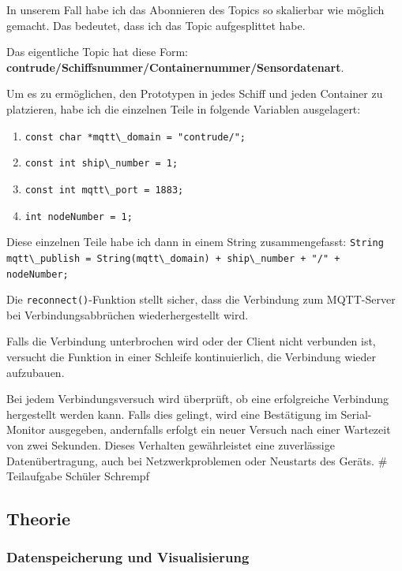 \documentclass[
    headings=optiontotocandhead,%
    twoside,
    numbers=noenddot,%
    12pt, %
    titlepage, %
    parskip=full, %
    listof=leveldown, 
    numbers=noenddot, %
    a4paper,DIV=14,
    BCOR=15mm,
]{scrbook}
\newcommand{\passthrough}[1]{#1}
\newcommand*{\authormark}{}
\newcommand*{\textauthor}[1]{%
   \renewcommand{\authormark}{\translate{author}: #1}%
   \ignorespaces
}
\providecommand{\tightlist}{%
  \setlength{\itemsep}{0pt}\setlength{\parskip}{0pt}}
\begin{document}
In unserem Fall habe ich das Abonnieren des Topics so skalierbar wie
möglich gemacht. Das bedeutet, dass ich das Topic aufgesplittet habe.

Das eigentliche Topic hat diese Form:
\textbf{contrude/Schiffsnummer/Containernummer/Sensordatenart}.

Um es zu ermöglichen, den Prototypen in jedes Schiff und jeden Container
zu platzieren, habe ich die einzelnen Teile in folgende Variablen
ausgelagert:

\begin{enumerate}
\def\labelenumi{\arabic{enumi}.}
\tightlist
\item
  \passthrough{\lstinline!const char *mqtt\_domain = "contrude/";!}
\item
  \passthrough{\lstinline!const int ship\_number = 1;!}
\item
  \passthrough{\lstinline!const int mqtt\_port = 1883;!}
\item
  \passthrough{\lstinline!int nodeNumber = 1;!}
\end{enumerate}

Diese einzelnen Teile habe ich dann in einem String zusammengefasst:
\passthrough{\lstinline!String mqtt\_publish = String(mqtt\_domain) + ship\_number + "/" + nodeNumber;!}

Die \passthrough{\lstinline!reconnect()!}-Funktion stellt sicher, dass
die Verbindung zum MQTT-Server bei Verbindungsabbrüchen
wiederhergestellt wird.

Falls die Verbindung unterbrochen wird oder der Client nicht verbunden
ist, versucht die Funktion in einer Schleife kontinuierlich, die
Verbindung wieder aufzubauen.

Bei jedem Verbindungsversuch wird überprüft, ob eine erfolgreiche
Verbindung hergestellt werden kann. Falls dies gelingt, wird eine
Bestätigung im Serial-Monitor ausgegeben, andernfalls erfolgt ein neuer
Versuch nach einer Wartezeit von zwei Sekunden. Dieses Verhalten
gewährleistet eine zuverlässige Datenübertragung, auch bei
Netzwerkproblemen oder Neustarts des Geräts. \# Teilaufgabe Schüler
Schrempf

\textauthor{Marko Daniel Schrempf}

\hypertarget{theorie-1}{%
\subsection{Theorie}\label{theorie-1}}

\hypertarget{datenspeicherung-und-visualisierung}{%
\subsubsection{Datenspeicherung und
Visualisierung}\label{datenspeicherung-und-visualisierung}}
\end{document}
